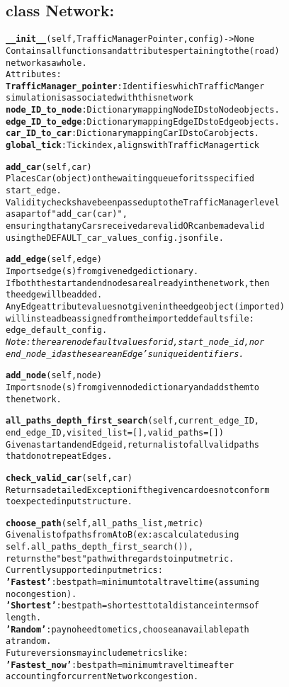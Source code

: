 \subsection{class Network:}

\begin{alltt}
\textbf{__init__}(self, TrafficManagerPointer, config) -> None
Contains all functions and attributes pertaining to the (road) 
network as a whole.
Attributes:
    \textbf{TrafficManager_pointer}:  Identifies which TrafficManger 
    simulation is associated with this network
    \textbf{node_ID_to_node}:  Dictionary mapping Node IDs to Node objects.
    \textbf{edge_ID_to_edge}:  Dictionary mapping Edge IDs to Edge objects.
    \textbf{car_ID_to_car}:  Dictionary mapping Car IDs to Car objects.
    \textbf{global_tick}:  Tick index, aligns with TrafficManager tick

\textbf{add_car}(self, car)
Places Car (object) on the waiting queue for its specified 
start_edge.
Validity checks have been passed up to the TrafficManager level 
as a part of "add_car(car)",
ensuring that any Cars received are valid OR can be made valid 
using the DEFAULT_car_values_config.json file.

\textbf{add_edge}(self, edge)
Imports edge(s) from given edge dictionary.
If both the start and end nodes are already in the network, then 
the edge will be added.
Any Edge attribute values not given in the edge object (imported) 
will instead be assigned from the imported defaults file:
edge_default_config.
\textit{Note:  there are no default values for id, start_node_id, nor 
end_node_id as these are an Edge's unique identifiers.}

\textbf{add_node}(self, node)
Imports node(s) from given node dictionary and adds them to 
the network.

\textbf{all_paths_depth_first_search}(self, current_edge_ID, 
end_edge_ID, visited_list=[], valid_paths=[])
Given a start and end Edge id, return a list of all valid paths 
that do not repeat Edges.

\textbf{check_valid_car}(self, car)
Returns a detailed Exception if the given car does not conform 
to expected input structure.

\textbf{choose_path}(self, all_paths_list, metric)
Given a list of paths from A to B (ex: as calculated using
self.all_paths_depth_first_search()),
returns the "best" path with regards to input metric.
Currently supported input metrics:
    \textbf{'Fastest'}: best path = minimum total travel time (assuming 
    no congestion).
    \textbf{'Shortest'}: best path = shortest total distance in terms of 
    length.
    \textbf{'Random'}:  pay no heed to metics, choose an available path 
    at random.
Future versions may include metrics like:
    \textbf{'Fastest_now'}: best path = minimum travel time after 
    accounting for current Network congestion.


\end{alltt}
